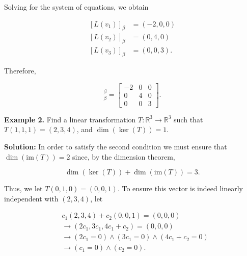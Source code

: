 \documentclass[12pt, a4paper]{article}
\begin{document}
 \vspace{2mm}
 
 \noindent Solving for the system of equations, we obtain
 
 \begin{equation*}
    \begin{split}
        [L(v_1)]_{\beta}&=(-2,0,0) \\
        [L(v_2)]_{\beta}&=(0,4,0) \\
        [L(v_3)]_{\beta}&=(0,0,3).
    \end{split}
 \end{equation*}
 
 \vspace{2mm}
 
 \noindent Therefore,
 
 \newpage
 
 \begin{equation*}
     [L]_{\beta}^{\beta}=\begin{bmatrix} -2 & 0 & 0 \\ 0 & 4 & 0 \\ 0 & 0 & 3 \end{bmatrix}.
 \end{equation*}
 
 \vspace{4mm}
 
 \noindent\textbf{Example 2.} Find a linear transformation $T\colon\mathbb{R}^3\rightarrow\mathbb{R}^3$ such that $T(1,1,1)=(2,3,4)$, and $\dim(\ker(T))=1$.
 
 \vspace{2mm}
 
 \textbf{Solution:} In order to satisfy the second condition we must ensure that $\dim(\text{im}(T))=2$ since, by the dimension theorem,
 
 \begin{equation*}
    \dim(\ker(T))+\dim(\text{im}(T))=3. 
 \end{equation*}
 
 \vspace{2mm}
 
 \noindent Thus, we let $T(0,1,0)=(0,0,1)$. To ensure this vector is indeed linearly independent with $(2,3,4)$, let
 
 \begin{equation*}
    \begin{split}
        &c_1(2,3,4)+c_2(0,0,1) = (0,0,0) \\
        &\rightarrow (2c_1,3c_1,4c_1+c_2)=(0,0,0) \\
        &\rightarrow (2c_1=0)\wedge(3c_1=0)\wedge(4c_1+c_2=0) \\
        &\rightarrow (c_1=0)\wedge(c_2=0).
    \end{split}
 \end{equation*}
 
\end{document}
